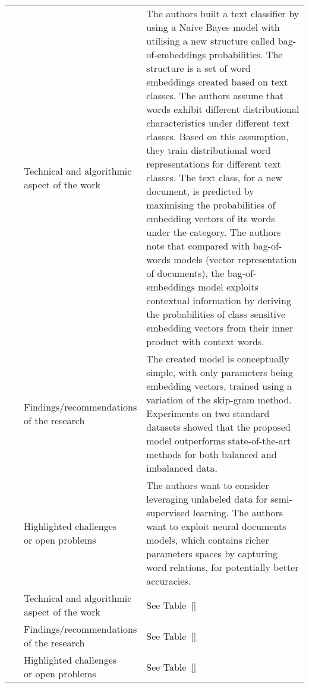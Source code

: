 \begin{landscape}
\begin{longtable}{lp{}p{}}
	\multirow{3}[0]{*}{~\citep{Jin2016}} & 
    \specialcell{Technical and algorithmic \\ aspect of the work} &
	The authors built a text classifier by using a Naive Bayes model with utilising a new structure called bag-of-embeddings probabilities. The structure is a set of word embeddings created based on text classes. The authors assume that words exhibit different distributional characteristics under different text classes. Based on this assumption, they train distributional word representations for different text classes. The text class, for a new document, is predicted by maximising the probabilities of embedding vectors of its words under the category. The authors note that compared with bag-of-words models (vector representation of documents), the bag-of-embeddings model exploits contextual information by deriving the probabilities of class sensitive embedding vectors from their inner product with context words.
    \\ & 
    \specialcell{Findings/recommendations \\ of the research} & 
	The created model is conceptually simple, with only parameters being embedding vectors, trained using a variation of the skip-gram method. Experiments on two standard datasets showed that the proposed model outperforms state-of-the-art methods for both balanced and imbalanced data.   
    \\ & 
    \specialcell{Highlighted challenges \\ or open problems} & 
	The authors want to consider leveraging unlabeled data for semi-supervised learning. The authors want to exploit neural documents models, which contains richer parameters spaces by capturing word relations, for potentially better accuracies.
	\\
	
	\multirow{3}[0]{*}{~\citep{AlSalemi2016}} & 
    \specialcell{Technical and algorithmic \\ aspect of the work} &
    See Table~\ref{}
    \\ & 
    \specialcell{Findings/recommendations \\ of the research} & 
	See Table~\ref{}
    \\ & 
    \specialcell{Highlighted challenges \\ or open problems} & 
	See Table~\ref{}
	\\
	

\end{longtable}
\end{landscape}
